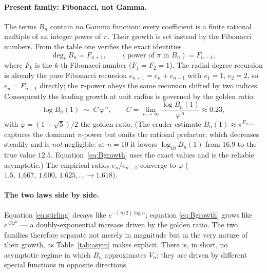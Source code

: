 \documentclass[11pt,a4paper]{article}
\theoremstyle{definition}
\begin{document}
\paragraph{Present family: Fibonacci, not Gamma.} The terms \(B_n\) contain no Gamma function: every coefficient is a finite rational multiple of an integer power of \(\pi\). Their growth is set instead by the Fibonacci numbers. From the table one verifies the exact identities
\begin{equation}
\deg_r B_n = F_{n+1}, \qquad (\text{power of }\pi\text{ in }B_n) = F_{n-1},
\label{eq:fibexp}
\end{equation}
where \(F_k\) is the \(k\)-th Fibonacci number (\(F_1=F_2=1\)). The radial-degree recursion is already the pure Fibonacci recursion \(e_{n+1}=e_n+e_{n-1}\) with \(e_1=1,\,e_2=2\), so \(e_n=F_{n+1}\) directly; the \(\pi\)-power obeys the same recursion shifted by two indices. Consequently the leading growth at unit radius is governed by the golden ratio:
\begin{equation}
\log B_n(1)\;\sim\;C\,\varphi^{\,n}, \qquad C = \lim_{n\to\infty}\frac{\log B_n(1)}{\varphi^{\,n}}\approx 0.23,
\label{eq:Bgrowth}
\end{equation}
with \(\varphi=(1+\sqrt5)/2\) the golden ratio. (The cruder estimate \(B_n(1)\approx\pi^{F_{n-1}}\) captures the dominant \(\pi\)-power but omits the rational prefactor, which decreases steadily and is \emph{not} negligible: at \(n=10\) it lowers \(\log_{10}B_n(1)\) from \(16.9\) to the true value \(12.5\). Equation~\eqref{eq:Bgrowth} uses the exact values and is the reliable asymptotic.) The empirical ratios \(e_n/e_{n-1}\) converge to \(\varphi\) (\(1.5,\,1.667,\,1.600,\,1.625,\dots\to 1.618\)).

\paragraph{The two laws side by side.} Equation \eqref{eq:stirling} decays like \(e^{-(n/2)\log n}\); equation \eqref{eq:Bgrowth} grows like \(e^{\,C\varphi^n}\) — a doubly-exponential increase driven by the golden ratio. The two families therefore separate not merely in magnitude but in the very nature of their growth, as Table~\ref{tab:asym} makes explicit. There is, in short, no asymptotic regime in which \(B_n\) approximates \(V_n\); they are driven by different special functions in opposite directions.
\end{document}
